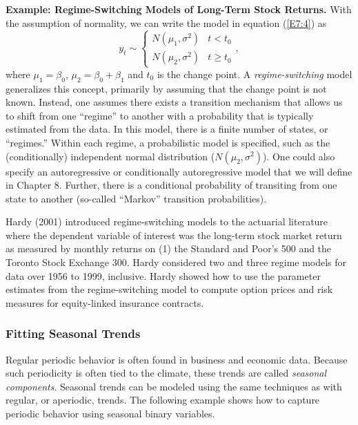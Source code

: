 \textbf{Example: Regime-Switching Models of Long-Term Stock
Returns.} With the assumption
of normality, we can write the model in equation (\ref{E7:4}) as
\begin{equation*}
y_t \sim \left\{
\begin{array}{ll}
N(\mu_1, \sigma^2) & t < t_0 \\
N(\mu_2, \sigma^2)& t \geq t_0
\end{array}
\right. ,
\end{equation*}
where $\mu_1 = \beta_0$, $\mu_2 = \beta_0 + \beta_1$ and $t_0$ is
the change point. A \emph{regime-switching} model generalizes this
concept, primarily by assuming that the change point is not known.
Instead, one assumes there exists a transition mechanism that allows
us to shift from one ``regime'' to another with a probability that
is typically estimated from the data. In this model, there is a
finite number of states, or ``regimes.'' Within each regime, a
probabilistic model is specified, such as the (conditionally)
independent normal distribution ($N(\mu_2, \sigma^2)$). One could
also specify an autoregressive or conditionally autoregressive model
that we will define in Chapter 8. Further, there is a conditional
probability of transiting from one state to another (so-called
``Markov'' transition probabilities).

Hardy (2001) introduced regime-switching models to the actuarial
literature where the dependent variable of interest was the
long-term stock market return as measured by  monthly returns on (1)
the Standard and Poor's 500 and the Toronto Stock Exchange 300.
Hardy considered two and three regime models for data over 1956 to
1999, inclusive. Hardy showed how to use the parameter estimates
from the regime-switching model to compute option prices and risk
measures for equity-linked insurance contracts.

\linejed


\subsubsection*{Fitting Seasonal Trends}

Regular periodic behavior is often found in business and economic
data. Because such periodicity is often tied to the climate, these
trends are called \emph{seasonal components}. Seasonal trends can be
modeled using the same techniques as with regular, or aperiodic,
trends. The following example shows how to capture periodic behavior
using seasonal binary variables.

